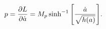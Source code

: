 \begin{equation}
p = {\partial L\over{\partial \dot a}} = M_p \sinh^{-1}\Bigg[{\dot
a\over{\sqrt {h(a)}}}\Bigg].
\label{mom}
\end{equation}

